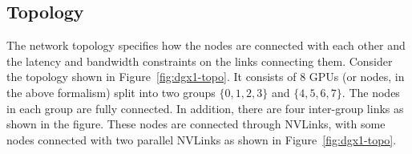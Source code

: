 \begin{comment}
    For instance, given a set of nodes each having an array of data, the \allreduce primitive computes the sum (or some specified associative operation) of all these arrays and stores the result in each of these arrays.

Computing the primitives such as \allreduce requires the nodes to communicate. This communication usually happens in smaller chunks of the input array. Given $N$ nodes, say we split the input array into $N$ chunks, where $c_{i,j}$ represents the $i$th chunk at node $j$. One way to compute \allreduce is as follows. First, we compute at node $i$, a partial sum $d_i = \sum_j c_{i,j}$. These reductions can be performed by arranging $N$ nodes in a spanning tree and communicating chunks $c_{i,j}$ along the tree. Note, there are $N$ parallel reductions each possibly using a different spanning tree. This arrangement of reduced data is called the \reducescatter primitive. Once we have the chunks $d_i$, we can perform an \allgather operation by ensuring each node has a copy of $d_i$. In essence, \allgather involves $N$ simultaneous broadcasts of $d_i$ from node $i$. Thus, we have implemented \allreduce by performing an \reducescatter followed by an \allgather.
\todo{I think the ``$N$ parallel reductions each possibly using a different spanning tree'' makes this confusing---is this describing an approach where each node reduces $1/N$ of the chunks?}
\todo{say "compute at node $i$, a partial sum" of chunk $i$.}
\todo{they're are a part of the sum of arrays. they are not really partial sums, in the sense that, e.g., only data from half of the nodes are added.}
\todo{"there are $N$ parallel reductions"=>these $N$ parallel reductions}

Implementing a collective communication primitive depends on the topology. For instance, when executing parallel reductions or broadcasts in the implementation above, the algorithm has to choose different spanning trees to utilize the bandwidth on all links in the topology. Similarly, the algorithm has to choose the ideal chunk size to use for communication. We will demonstrate these choices for the \dgxone topology described below.
\todo{"Implementing" $\ldots$ efficiently}
\todo{"has to chose ": might have to choose}
\end{comment}

\subsection{Topology}
The network topology specifies how the nodes are connected with each other and the latency and bandwidth constraints on the links connecting them. Consider the \dgxone topology shown in Figure~\ref{fig:dgx1-topo}. It consists of $8$ GPUs (or nodes, in the above formalism) split into two groups $\{0,1,2,3\}$ and $\{4,5,6,7\}$. The nodes in each group are fully connected. In addition, there are four inter-group links as shown in the figure. These nodes are connected through
NVLinks, with some nodes connected with two parallel NVLinks as shown in Figure~\ref{fig:dgx1-topo}.


